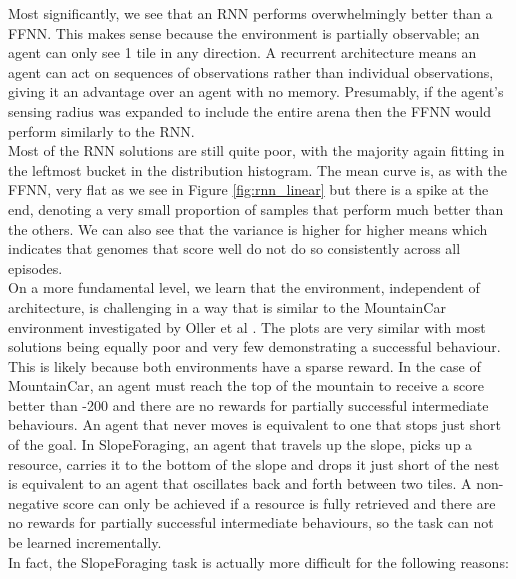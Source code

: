 \documentclass[12pt]{article}
\begin{document}
Most significantly, we see that an RNN performs overwhelmingly better than a FFNN. This makes sense because the environment is partially observable; an agent can only see 1 tile in any direction. A recurrent architecture means an agent can act on sequences of observations rather than individual observations, giving it an advantage over an agent with no memory. Presumably, if the agent's sensing radius was expanded to include the entire arena then the FFNN would perform similarly to the RNN.\\ 

Most of the RNN solutions are still quite poor, with the majority again fitting in the leftmost bucket in the distribution histogram. The mean curve is, as with the FFNN, very flat as we see in Figure \ref{fig:rnn_linear} but there is a spike at the end, denoting a very small proportion of samples that perform much better than the others. We can also see that the variance is higher for higher means which indicates that genomes that score well do not do so consistently across all episodes.\\

On a more fundamental level, we learn that the environment, independent of architecture, is challenging in a way that is similar to the MountainCar \cite{MountainCar} environment investigated by Oller et al \cite{oller:2020:arXiv}. The plots are very similar with most solutions being equally poor and very few demonstrating a successful behaviour. This is likely because both environments have a sparse reward. In the case of MountainCar, an agent must reach the top of the mountain to receive a score better than -200 and there are no rewards for partially successful intermediate behaviours. An agent that never moves is equivalent to one that stops just short of the goal. In SlopeForaging, an agent that travels up the slope, picks up a resource, carries it to the bottom of the slope and drops it just short of the nest is equivalent to an agent that oscillates back and forth between two tiles. A non-negative score can only be achieved if a resource is fully retrieved and there are no rewards for partially successful intermediate behaviours, so the task can not be learned incrementally.\\

In fact, the SlopeForaging task is actually more difficult for the following reasons:
\end{document}

